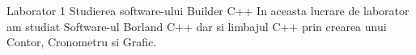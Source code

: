Laborator 1
Studierea software-ului Builder C++ In aceasta lucrare de laborator am studiat Software-ul Borland C++ dar si limbajul C++ prin crearea unui Contor, Cronometru si Grafic.